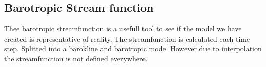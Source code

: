 \subsection{Barotropic Stream function}
\label{sec:BSF}

Thee barotropic streamfunction is a usefull tool to see if the model we have created is representative of reality. The streamfunction is calculated each time  step. Splitted into a barokline and barotropic mode. However due to interpolation the streamfunction is not defined everywhere.




